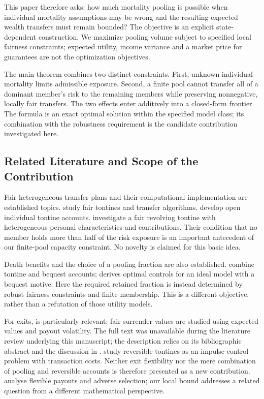 \documentclass[11pt,a4paper]{article}
\theoremstyle{definition}\newtheorem{definition}[theorem]{Definition}
\theoremstyle{remark}\newtheorem{remark}[theorem]{Remark}
\begin{document}
This paper therefore asks: how much mortality pooling is possible when individual mortality assumptions may be wrong and the resulting expected wealth transfers must remain bounded? The objective is an explicit state-dependent construction. We maximize pooling volume subject to specified local fairness constraints; expected utility, income variance and a market price for guarantees are not the optimization objectives.

The main theorem combines two distinct constraints. First, unknown individual mortality limits admissible exposure. Second, a finite pool cannot transfer all of a dominant member's risk to the remaining members while preserving nonnegative, locally fair transfers. The two effects enter additively into a closed-form frontier. The formula is an exact optimal solution within the specified model class; its combination with the robustness requirement is the candidate contribution investigated here.

\subsection{Related Literature and Scope of the Contribution}
Fair heterogeneous transfer plans and their computational implementation are established topics. \citet{sabin2010,sabin2011} study fair tontines and transfer algorithms. \citet{fullmer2019} develop open individual tontine accounts. \citet{weinert2021} investigate a fair revolving tontine with heterogeneous personal characteristics and contributions. Their condition that no member holds more than half of the risk exposure is an important antecedent of our finite-pool capacity constraint. No novelty is claimed for this basic idea.

Death benefits and the choice of a pooling fraction are also established. \citet{bernhardt2019} combine tontine and bequest accounts; \citet{dagpunar2021} derives optimal controls for an ideal model with a bequest motive. Here the required retained fraction is instead determined by robust fairness constraints and finite membership. This is a different objective, rather than a refutation of those utility models.

For exits, \citet{weinert2017} is particularly relevant: fair surrender values are studied using expected values and payout volatility. The full text was unavailable during the literature review underlying this manuscript; the description relies on its bibliographic abstract and the discussion in \citet{weinert2021}. \citet{he2023} study reversible tontines as an impulse-control problem with transaction costs. Neither exit flexibility nor the mere combination of pooling and reversible accounts is therefore presented as a new contribution. \citet{butt2026} analyse flexible payouts and adverse selection; our local bound addresses a related question from a different mathematical perspective.
\end{document}
